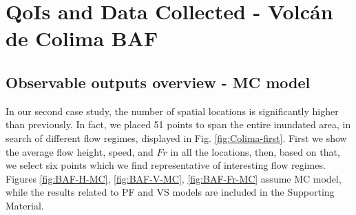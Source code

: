 \documentclass{article}
\begin{document}
\section{QoIs and Data Collected - Volc{\'a}n de Colima BAF}\label{QoI2}
\subsection{Observable outputs overview - MC model}
In our second case study, the number of spatial locations is significantly higher than previously. In fact, we placed 51 points to span the entire inundated area, in search of different flow regimes, displayed in Fig. \ref{fig:Colima-first}. First we show the average flow height, speed, and $Fr$ in all the locations, then, based on that, we select six points which we find representative of interesting flow regimes. Figures \ref{fig:BAF-H-MC}, \ref{fig:BAF-V-MC}, \ref{fig:BAF-Fr-MC} assume MC model, while the results related to PF and VS models are included in the Supporting Material.
\end{document}
